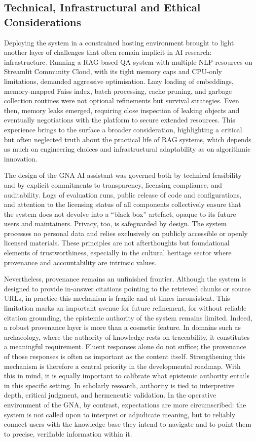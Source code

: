 \begin{spacing}{1.5}
\section{Technical, Infrastructural and Ethical Considerations}
Deploying the system in a constrained hosting environment brought to light another layer of challenges that often remain implicit in AI research: infrastructure. Running a RAG-based QA system with multiple NLP resources on Streamlit Community Cloud, with its tight memory caps and CPU-only limitations, demanded aggressive optimisation. Lazy loading of embeddings, memory-mapped Faiss index, batch processing, cache pruning, and garbage collection routines were not optional refinements but survival strategies. Even then, memory leaks emerged, requiring close inspection of leaking objects and eventually negotiations with the platform to secure extended resources. This experience brings to the surface a broader consideration, highlighting a critical but often neglected truth about the practical life of RAG systems, which depends as much on engineering choices and infrastructural adaptability as on algorithmic innovation.

The design of the GNA AI assistant was governed both by technical feasibility and by explicit commitments to transparency, licensing compliance, and auditability. Logs of evaluation runs, public release of code and configurations, and attention to the licensing status of all components collectively ensure that the system does not devolve into a ``black box'' artefact, opaque to its future users and maintainers. Privacy, too, is safeguarded by design. The system processes no personal data and relies exclusively on publicly accessible or openly licensed materials. These principles are not afterthoughts but foundational elements of trustworthiness, especially in the cultural heritage sector where provenance and accountability are intrinsic values.

Nevertheless, provenance remains an unfinished frontier. Although the system is designed to provide in-answer citations pointing to the retrieved chunks or source URLs, in practice this mechanism is fragile and at times inconsistent. This limitation marks an important avenue for future refinement, for without reliable citation grounding, the epistemic authority of the system remains limited. Indeed, a robust provenance layer is more than a cosmetic feature. In domains such as archaeology, where the authority of knowledge rests on traceability, it constitutes a meaningful requirement. Fluent responses alone do not suffice; the provenance of those responses is often as important as the content itself. Strengthening this mechanism is therefore a central priority in the developmental roadmap. With this in mind, it is equally important to calibrate what epistemic authority entails in this specific setting. In scholarly research, authority is tied to interpretive depth, critical judgment, and hermeneutic validation. In the operative environment of the GNA, by contrast, expectations are more circumscribed: the system is not called upon to interpret or adjudicate meaning, but to reliably connect users with the knowledge base they intend to navigate and to point them to precise, verifiable information within it.


\end{spacing}
